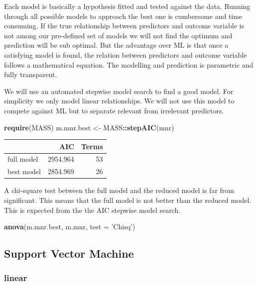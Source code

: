 \documentclass[]{article}
\newenvironment{Shaded}{\begin{snugshade}}{\end{snugshade}}
\newcommand{\DataTypeTok}[1]{\textcolor[rgb]{0.13,0.29,0.53}{#1}}
\newcommand{\KeywordTok}[1]{\textcolor[rgb]{0.13,0.29,0.53}{\textbf{#1}}}
\newcommand{\NormalTok}[1]{#1}
\newcommand{\OperatorTok}[1]{\textcolor[rgb]{0.81,0.36,0.00}{\textbf{#1}}}
\newcommand{\StringTok}[1]{\textcolor[rgb]{0.31,0.60,0.02}{#1}}
\begin{document}
Each model is basically a hypothesis fitted and tested against the data.
Running through all possible models to approach the best one is
cumbersome and time consuming. If the true relationship between
predictors and outcome variable is not among our pre-defined set of
models we will not find the optimum and prediction will be sub optimal.
But the advantage over ML is that once a satisfying model is found, the
relation between predictors and outcome variable follows a mathematical
equation. The modelling and prediction is parametric and fully
transparent.

We will use an automated stepwise model search to find a good model. For
simplicity we only model linear relationships. We will not use this
model to compete against ML but to separate relevant from irrelevant
predictors.

\begin{Shaded}
\begin{Highlighting}[]
\KeywordTok{require}\NormalTok{(MASS)}
\NormalTok{m.mnr.best <-}\StringTok{ }\NormalTok{MASS}\OperatorTok{::}\KeywordTok{stepAIC}\NormalTok{(mnr)}
\end{Highlighting}
\end{Shaded}

\begin{longtable}[]{@{}lrr@{}}
\toprule
& AIC & Terms\tabularnewline
\midrule
\endhead
full model & 2954.964 & 53\tabularnewline
best model & 2854.969 & 26\tabularnewline
\bottomrule
\end{longtable}

A chi-square test between the full model and the reduced model is far
from significant. This means that the full model is not better than the
reduced model. This is expected from the the AIC stepwise model search.

\begin{Shaded}
\begin{Highlighting}[]
\KeywordTok{anova}\NormalTok{(m.mnr.best, m.mnr, }\DataTypeTok{test =} \StringTok{'Chisq'}\NormalTok{)}
\end{Highlighting}
\end{Shaded}

\hypertarget{support-vector-machine}{%
\subsection{Support Vector Machine}\label{support-vector-machine}}

\hypertarget{linear}{%
\subsubsection{linear}\label{linear}}
\end{document}
